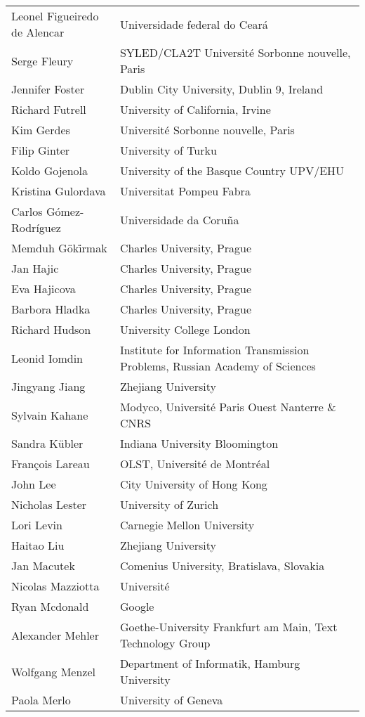 \documentclass{easychair}
\begin{document}
\begin{longtable}{p{}p{}}
Leonel Figueiredo de Alencar & Universidade federal do Cear\'a\\
Serge Fleury & SYLED/CLA2T Universit\'e Sorbonne nouvelle, Paris\\
Jennifer Foster & Dublin City University, Dublin 9, Ireland\\
Richard Futrell & University of California, Irvine\\
Kim Gerdes & Universit\'e Sorbonne nouvelle, Paris\\
Filip Ginter & University of Turku\\
Koldo Gojenola & University of the Basque Country UPV/EHU\\
Kristina Gulordava & Universitat Pompeu Fabra\\
Carlos G\'omez-Rodr\'iguez & Universidade da Coru\~{n}a\\
Memduh G\"ok\.irmak & Charles University, Prague\\
Jan Hajic & Charles University, Prague\\
Eva Hajicova & Charles University, Prague\\
Barbora Hladka & Charles University, Prague\\
Richard Hudson & University College London\\
Leonid Iomdin & Institute for Information Transmission Problems, Russian Academy of Sciences\\
Jingyang Jiang & Zhejiang University\\
Sylvain Kahane & Modyco, Universit\'e Paris Ouest Nanterre \& CNRS\\
Sandra K\"ubler & Indiana University Bloomington\\
Fran\c{c}ois Lareau & OLST, Universit\'e de Montr\'eal\\
John Lee & City University of Hong Kong\\
Nicholas Lester & University of Zurich\\
Lori Levin & Carnegie Mellon University\\
Haitao Liu & Zhejiang University\\
Jan Macutek & Comenius University, Bratislava, Slovakia\\
Nicolas Mazziotta & Universit\'e\\
Ryan Mcdonald & Google\\
Alexander Mehler & Goethe-University Frankfurt am Main, Text Technology Group\\
Wolfgang Menzel & Department of Informatik, Hamburg University\\
Paola Merlo & University of Geneva\\

\end{longtable}
\end{document}
